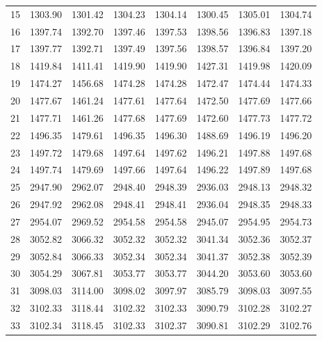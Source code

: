 \documentclass[10pt,oneside]{article}
\begin{document}
\begin{table}[h!]
\begin{tabular}{cccccccc}
15 &   1303.90 & 1301.42 & 1304.23 &    1304.14 &      1300.45 & 1305.01 &   1304.74 \\
16 &   1397.74 & 1392.70 & 1397.46 &    1397.53 &      1398.56 & 1396.83 &   1397.18 \\
17 &   1397.77 & 1392.71 & 1397.49 &    1397.56 &      1398.57 & 1396.84 &   1397.20 \\
18 &   1419.84 & 1411.41 & 1419.90 &    1419.90 &      1427.31 & 1419.98 &   1420.09 \\
19 &   1474.27 & 1456.68 & 1474.28 &    1474.28 &      1472.47 & 1474.44 &   1474.33 \\
20 &   1477.67 & 1461.24 & 1477.61 &    1477.64 &      1472.50 & 1477.69 &   1477.66 \\
21 &   1477.71 & 1461.26 & 1477.68 &    1477.69 &      1472.60 & 1477.73 &   1477.72 \\
22 &   1496.35 & 1479.61 & 1496.35 &    1496.30 &      1488.69 & 1496.19 &   1496.20 \\
23 &   1497.72 & 1479.68 & 1497.64 &    1497.62 &      1496.21 & 1497.88 &   1497.68 \\
24 &   1497.74 & 1479.69 & 1497.66 &    1497.64 &      1496.22 & 1497.89 &   1497.68 \\
25 &   2947.90 & 2962.07 & 2948.40 &    2948.39 &      2936.03 & 2948.13 &   2948.32 \\
26 &   2947.92 & 2962.08 & 2948.41 &    2948.41 &      2936.04 & 2948.35 &   2948.33 \\
27 &   2954.07 & 2969.52 & 2954.58 &    2954.58 &      2945.07 & 2954.95 &   2954.73 \\
28 &   3052.82 & 3066.32 & 3052.32 &    3052.32 &      3041.34 & 3052.36 &   3052.37 \\
29 &   3052.84 & 3066.33 & 3052.34 &    3052.34 &      3041.37 & 3052.38 &   3052.39 \\
30 &   3054.29 & 3067.81 & 3053.77 &    3053.77 &      3044.20 & 3053.60 &   3053.60 \\
31 &   3098.03 & 3114.00 & 3098.02 &    3097.97 &      3085.79 & 3098.03 &   3097.55 \\
32 &   3102.33 & 3118.44 & 3102.32 &    3102.33 &      3090.79 & 3102.28 &   3102.27 \\
33 &   3102.34 & 3118.45 & 3102.33 &    3102.37 &      3090.81 & 3102.29 &   3102.76 \\
\bottomrule
\end{tabular}
\end{table}
\end{document}
